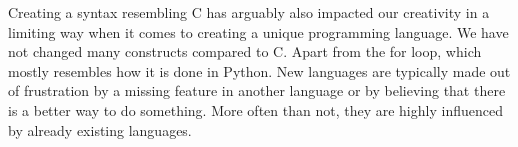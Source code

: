 Creating a syntax resembling C has arguably also impacted our creativity in a limiting way when it comes to creating a unique programming language. We have not changed many constructs compared to C. Apart from the for loop, which mostly resembles how it is done in Python. New languages are typically made out of frustration by a missing feature in another language or by believing that there is a better way to do something. More often than not, they are highly influenced by already existing languages.